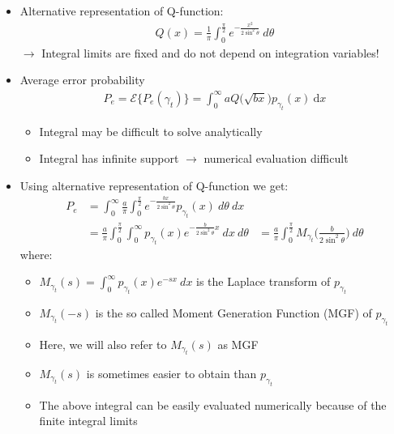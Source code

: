 \documentclass[a4paper, 10pt]{article}
\begin{document}
\begin{itemize}
	\item Alternative representation of Q\;-\;function:
			\begin{align*} 
			Q(x) = \frac{1}{\pi}\int_{0}^{\frac{\pi}{2}} e^{-\frac{x^2}{2\sin^2\theta}}~d\theta
			\end{align*}
			$\rightarrow$ Integral limits are fixed and do not depend on integration variables!
	\item Average error probability
		\begin{align*} 
		P_e = \mathcal{E}\bigl \{P_e(\gamma_t)\bigr \} = \int_{0}^{\infty}aQ\bigr (\sqrt{bx}\bigl )p_{\gamma_t}(x)~\mathrm{d}x
		\end{align*}
		\begin{itemize}
			\item Integral may be difficult to solve analytically
			\item Integral has infinite support $\rightarrow$ numerical evaluation difficult
		\end{itemize}
	\item Using alternative representation of Q-function we get:
		\begin{align*}
			P_e &= \int_{0}^{\infty}\frac{a}{\pi}\int_{0}^{\frac{\pi}{2}}e^{-\frac{bx}{2\sin^2\theta}}p_{\gamma_t}(x)~d\theta ~dx\\
			&= \frac{a}{\pi}\int_{0}^{\frac{\pi}{2}}\int_{0}^{\infty}p_{\gamma_t}(x)e^{-\frac{b}{2\sin^2\theta}x}~dx~d\theta &= \frac{a}{\pi}\int_{0}^{\frac{\pi}{2}}M_{\gamma_t}\bigl ( \frac{b}{2\sin^2\theta} \bigr )~d\theta
		\end{align*}
where:
		\begin{itemize}
				\item $M_{\gamma_t}(s) = \int_{0}^{\infty}p_{\gamma_t}(x)e^{-sx}~dx$ is the Laplace transform of $p_{\gamma_t}$	
				\item $M_{\gamma_t}(-s)$ is the so called Moment Generation Function (MGF) of $p_{\gamma_t}$
				\item Here, we will also refer to $M_{\gamma_t}(s)$ as MGF
				\item $M_{\gamma_t}(s)$ is sometimes easier to obtain than $p_{\gamma_t}$
				\item The above integral can be easily evaluated numerically because of the finite integral limits
			\end{itemize}
\end{itemize}
\end{document}

